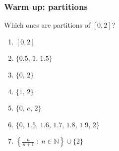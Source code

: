 \documentclass[14pt]{beamer}
\begin{document}



	\begin{frame}[t]
		\frametitle{Warm up: partitions}

		Which ones are partitions of $[0,2]$?

		\begin{enumerate}
			\item $\displaystyle [0,2]$

			\item $\displaystyle \{0.5, \,1, \,1.5\}$

			\item $\displaystyle \{0,\,2\}$

			\item $\displaystyle \{1,\,2\}$

			\item $\displaystyle \{0, \,e, \,2 \}$

			\item $\displaystyle \{0, \,1.5, \,1.6, \,1.7, \,1.8, \,1.9, \,2\}$

			\item $\displaystyle \left\{ \frac{n}{n+1}\; : \; n \in \mathbb{N}\right\}
				\cup \{ 2 \}$
		\end{enumerate}
	\end{frame}
\end{document}
